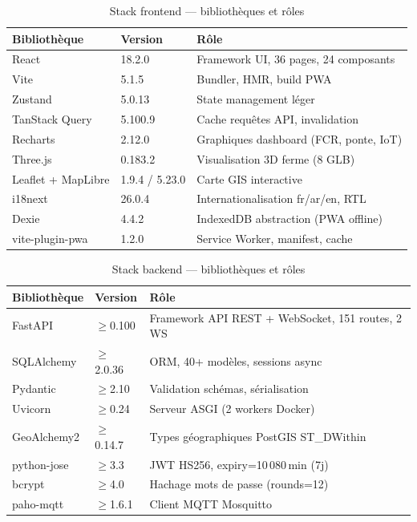 \begin{table}[H]
\centering
\caption{Stack frontend — bibliothèques et rôles}
\label{tab:frontend_stack}
\begin{tabularx}{\linewidth}{llX}
\toprule
\textbf{Bibliothèque} & \textbf{Version} & \textbf{Rôle} \\
\midrule
React          & 18.2.0 & Framework UI, 36 pages, 24 composants \\
Vite           & 5.1.5  & Bundler, HMR, build PWA \\
Zustand        & 5.0.13 & State management léger \\
TanStack Query & 5.100.9& Cache requêtes API, invalidation \\
Recharts       & 2.12.0 & Graphiques dashboard (FCR, ponte, IoT) \\
Three.js       & 0.183.2& Visualisation 3D ferme (8 GLB) \\
Leaflet + MapLibre & 1.9.4 / 5.23.0 & Carte GIS interactive \\
i18next        & 26.0.4 & Internationalisation fr/ar/en, RTL \\
Dexie          & 4.4.2  & IndexedDB abstraction (PWA offline) \\
vite-plugin-pwa& 1.2.0  & Service Worker, manifest, cache \\
\bottomrule
\end{tabularx}
\end{table}

\begin{table}[H]
\centering
\caption{Stack backend — bibliothèques et rôles}
\label{tab:backend_stack}
\begin{tabularx}{\linewidth}{llX}
\toprule
\textbf{Bibliothèque} & \textbf{Version} & \textbf{Rôle} \\
\midrule
FastAPI        & $\geq$0.100  & Framework API REST + WebSocket, 151 routes, 2 WS \\
SQLAlchemy     & $\geq$2.0.36 & ORM, 40+ modèles, sessions async \\
Pydantic       & $\geq$2.10   & Validation schémas, sérialisation \\
Uvicorn        & $\geq$0.24   & Serveur ASGI (2 workers Docker) \\
GeoAlchemy2    & $\geq$0.14.7 & Types géographiques PostGIS ST\_DWithin \\
python-jose    & $\geq$3.3    & JWT HS256, expiry=10\,080\,min (7j) \\
bcrypt         & $\geq$4.0    & Hachage mots de passe (rounds=12) \\
paho-mqtt      & $\geq$1.6.1  & Client MQTT Mosquitto \\
\bottomrule
\end{tabularx}
\end{table}

